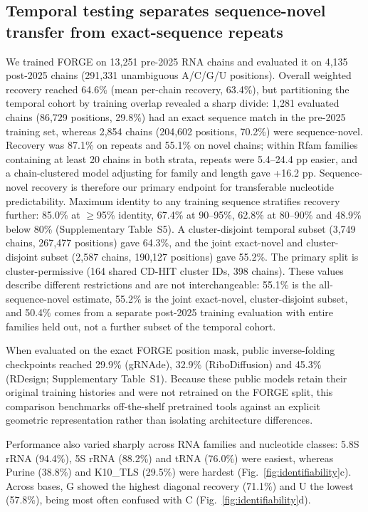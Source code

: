 \subsection{Temporal testing separates sequence-novel transfer from exact-sequence repeats}

We trained FORGE on 13,251 pre-2025 RNA chains and evaluated it on 4,135 post-2025
chains (291,331 unambiguous A/C/G/U positions). Overall weighted recovery reached 64.6\% (mean per-chain recovery, 63.4\%), but partitioning the temporal cohort by training overlap revealed a sharp divide: 1,281 evaluated chains (86,729 positions, 29.8\%) had an exact sequence match in the pre-2025 training set, whereas 2,854 chains (204,602 positions, 70.2\%) were sequence-novel. Recovery was 87.1\% on repeats and 55.1\% on novel chains; within Rfam families containing at least 20 chains
in both strata, repeats were 5.4--24.4 pp easier, and a chain-clustered model adjusting
for family and length gave +16.2 pp. Sequence-novel recovery is therefore our primary endpoint for transferable
nucleotide predictability. Maximum identity to any training sequence stratifies
recovery further: 85.0\% at $\ge$95\% identity, 67.4\% at 90--95\%, 62.8\% at 80--90\%
and 48.9\% below 80\% (Supplementary Table~S5). A cluster-disjoint temporal subset
(3,749 chains, 267,477 positions) gave 64.3\%, and the joint exact-novel
and cluster-disjoint subset (2,587 chains, 190,127 positions) gave 55.2\%.
The primary split is cluster-permissive (164 shared CD-HIT cluster IDs, 398 chains).
These values describe different restrictions and are not interchangeable:
55.1\% is the all-sequence-novel estimate, 55.2\% is the joint exact-novel,
cluster-disjoint subset, and 50.4\% comes from a separate post-2025 training evaluation with
entire families held out, not a further subset of the temporal cohort.

When evaluated on the exact FORGE position mask, public inverse-folding checkpoints reached 29.9\% (gRNAde), 32.9\% (RiboDiffusion) and 45.3\% (RDesign; Supplementary Table~S1). Because these public models retain their original training histories and were not retrained on the FORGE split, this comparison benchmarks off-the-shelf pretrained tools against an explicit geometric representation rather than isolating architecture differences.

Performance also varied sharply across RNA families and nucleotide classes: 5.8S rRNA (94.4\%), 5S rRNA (88.2\%) and tRNA (76.0\%) were easiest, whereas Purine (38.8\%) and K10\_TLS (29.5\%) were hardest (Fig.~\ref{fig:identifiability}c). Across bases, G showed the highest diagonal recovery (71.1\%) and U the lowest (57.8\%), being most often confused with C (Fig.~\ref{fig:identifiability}d).

